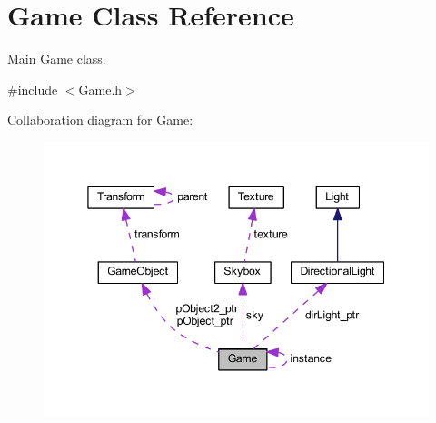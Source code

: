 \hypertarget{class_game}{}\section{Game Class Reference}
\label{class_game}


Main \mbox{\hyperlink{class_game}{Game}} class.  




{\ttfamily \#include $<$Game.\+h$>$}



Collaboration diagram for Game\+:
\nopagebreak
\begin{figure}[H]
\begin{center}
\leavevmode
\includegraphics[width=345pt]{class_game__coll__graph}
\end{center}
\end{figure}
